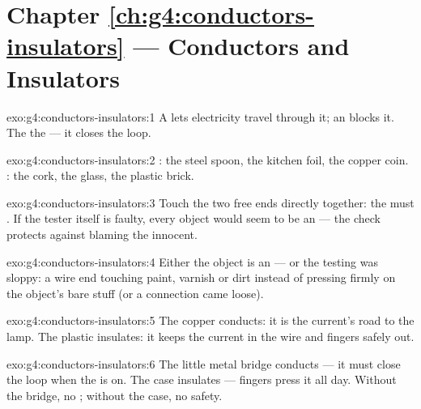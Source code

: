 \section*{Chapter \ref{ch:g4:conductors-insulators} --- Conductors and Insulators}

\begin{solution}{exo:g4:conductors-insulators:1}
A  lets electricity travel through it; an  blocks
it. The   the  --- it closes the loop.
\end{solution}

\begin{solution}{exo:g4:conductors-insulators:2}
: the steel spoon, the kitchen foil, the copper coin.
: the cork, the glass, the plastic brick.
\end{solution}

\begin{solution}{exo:g4:conductors-insulators:3}
Touch the two free ends directly together: the  must . If
the tester itself is faulty, every object would seem to be an
 --- the check protects against blaming the innocent.
\end{solution}

\begin{solution}{exo:g4:conductors-insulators:4}
Either the object is an  --- or the testing was sloppy: a
wire end touching paint, varnish or dirt instead of pressing firmly
on the object's bare stuff (or a connection came loose).
\end{solution}

\begin{solution}{exo:g4:conductors-insulators:5}
The copper conducts: it is the current's road to the lamp. The
plastic insulates: it keeps the current in the wire and fingers
safely out.
\end{solution}

\begin{solution}{exo:g4:conductors-insulators:6}
The little metal bridge conducts --- it must close the loop when
the  is on. The case insulates --- fingers press it all day.
Without the bridge, no ; without the case, no safety.
\end{solution}

